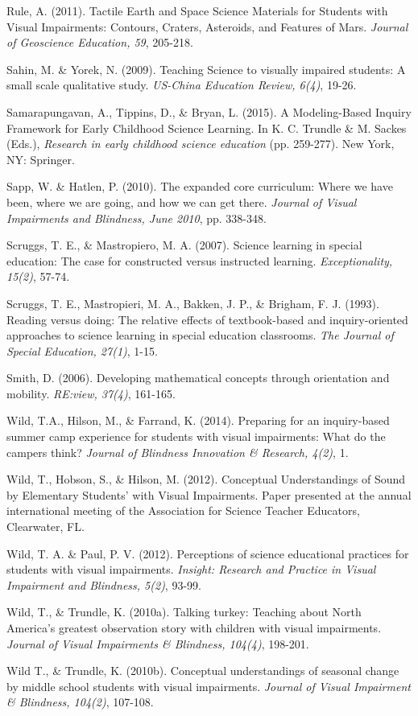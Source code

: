 \documentclass[11.5pt]{sig-alternate} %
\begin{document}
Rule, A. (2011). Tactile Earth and Space Science Materials for Students with Visual Impairments:  Contours, Craters, Asteroids, and Features of Mars.  \textit{Journal of Geoscience Education, 59}, 205-218.

Sahin, M. \& Yorek, N. (2009). Teaching Science to visually impaired students:  A small scale qualitative study. \textit{US-China Education Review, 6(4)}, 19-26.

Samarapungavan, A., Tippins, D., \& Bryan, L. (2015). A Modeling-Based Inquiry Framework for Early Childhood Science Learning.  In K. C. Trundle \& M. Sackes (Eds.), \textit{Research in early childhood science education} (pp. 259-277). New York, NY:  Springer.

Sapp, W. \& Hatlen, P. (2010). The expanded core curriculum:  Where we have been, where we are going, and how we can get there. \textit{Journal of Visual Impairments and Blindness, June 2010}, pp. 338-348.

Scruggs, T. E., \& Mastropiero, M. A. (2007). Science learning in special education:  The case for constructed versus instructed learning.  \textit{Exceptionality, 15(2)}, 57-74.

Scruggs, T. E., Mastropieri, M. A., Bakken, J. P., \& Brigham, F. J. (1993). Reading versus doing:  The relative effects of textbook-based and inquiry-oriented approaches to science learning in special education classrooms.  \textit{The Journal of Special Education, 27(1)}, 1-15.

Smith, D.  (2006). Developing mathematical concepts through orientation and mobility.  \textit{RE:view, 37(4)}, 161-165.

Wild, T.A., Hilson, M., \& Farrand, K. (2014). Preparing for an inquiry-based summer camp 	experience for students with visual impairments:  What do the campers think?  \textit{Journal of Blindness Innovation \& Research, 4(2)}, 1.

Wild, T., Hobson, S., \& Hilson, M. (2012). Conceptual Understandings of Sound by Elementary Students’ with Visual Impairments.  Paper presented at the annual international meeting of the Association for Science Teacher Educators, Clearwater, FL.

Wild, T. A. \& Paul, P. V. (2012). Perceptions of science educational practices for students with visual impairments. \textit{Insight: Research and Practice in Visual Impairment and Blindness, 5(2)}, 93-99.

Wild, T., \& Trundle, K. (2010a). Talking turkey:  Teaching about North America’s greatest observation story with children with visual impairments.  \textit{Journal of Visual Impairments \& Blindness, 104(4)}, 198-201.

Wild T., \& Trundle, K. (2010b). Conceptual understandings of seasonal change by middle school students with visual impairments.  \textit{Journal of Visual Impairment \& Blindness, 104(2)}, 107-108.
\end{document}
